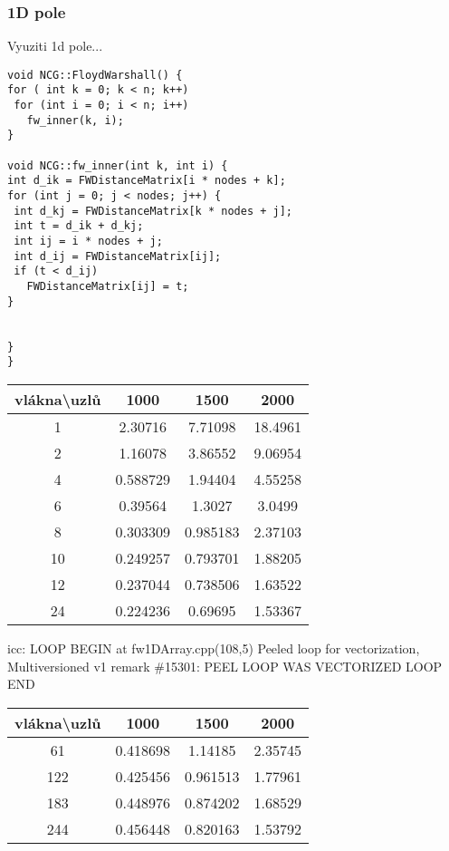 \documentclass[a4paper,11pt]{article}
\begin{document}
\subsubsection{1D pole}
Vyuziti 1d pole...

\lstset {language=C++}
\begin{lstlisting}
void NCG::FloydWarshall() {
for ( int k = 0; k < n; k++)
 for (int i = 0; i < n; i++)
   fw_inner(k, i);
}

void NCG::fw_inner(int k, int i) {
int d_ik = FWDistanceMatrix[i * nodes + k];
for (int j = 0; j < nodes; j++) {
 int d_kj = FWDistanceMatrix[k * nodes + j];
 int t = d_ik + d_kj;
 int ij = i * nodes + j;
 int d_ij = FWDistanceMatrix[ij];
 if (t < d_ij)
   FWDistanceMatrix[ij] = t;
}


}
}
\end{lstlisting}

\begin{tabular}{|c|c|c|c|}
	\hline vlákna\textbackslash  uzlů & 1000 & 1500 & 2000 \\ 
	\hline 1 & 2.30716 & 7.71098 & 18.4961 \\ 
	\hline 2 & 1.16078 & 3.86552 & 9.06954 \\ 
	\hline 4 & 0.588729 & 1.94404 & 4.55258 \\ 
	\hline 6 & 0.39564 & 1.3027 & 3.0499 \\ 
	\hline 8 & 0.303309 & 0.985183 & 2.37103 \\ 
	\hline 10 & 0.249257 & 0.793701 & 1.88205 \\ 
	\hline 12 & 0.237044 & 0.738506 & 1.63522 \\ 
	\hline 24 & 0.224236 & 0.69695 & 1.53367 \\ 
	\hline 
\end{tabular} 


icc:
LOOP BEGIN at fw1DArray.cpp(108,5)
 Peeled loop for vectorization, Multiversioned v1
remark \#15301: PEEL LOOP WAS VECTORIZED
LOOP END


\begin{tabular}{|c|c|c|c|}
	\hline vlákna\textbackslash  uzlů & 1000 & 1500 & 2000 \\ 
	\hline 61 & 0.418698 & 1.14185 & 2.35745 \\ 
	\hline 122 & 0.425456 & 0.961513 & 1.77961 \\ 
	\hline 183 & 0.448976 & 0.874202 & 1.68529 \\ 
	\hline 244 & 0.456448 & 0.820163 & 1.53792 \\ 
	\hline 
\end{tabular} 
\end{document}
